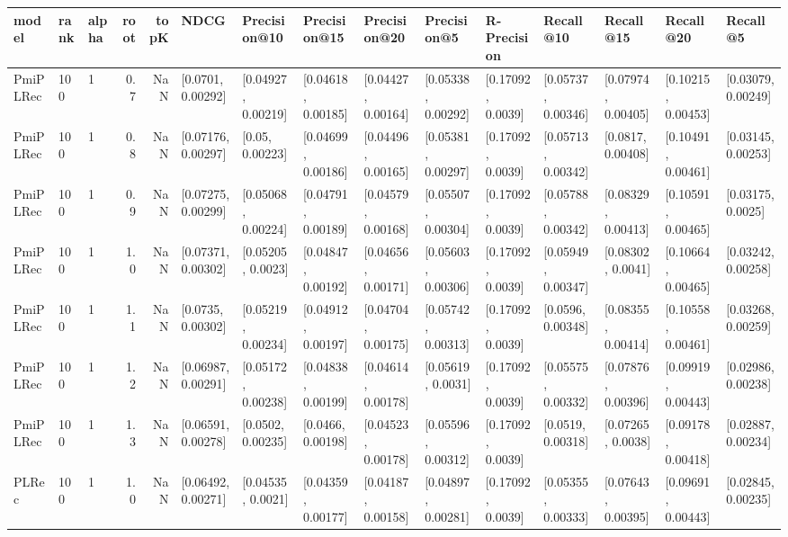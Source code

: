 \begin{tabular}{lllrrllllllllll}
\toprule
     model & rank & alpha &  root &  topK &                NDCG &        Precision@10 &        Precision@15 &        Precision@20 &         Precision@5 &        R-Precision &           Recall@10 &           Recall@15 &           Recall@20 &            Recall@5 \\
\midrule
  PmiPLRec &  100 &     1 &   0.7 &   NaN &   [0.0701, 0.00292] &  [0.04927, 0.00219] &  [0.04618, 0.00185] &  [0.04427, 0.00164] &  [0.05338, 0.00292] &  [0.17092, 0.0039] &  [0.05737, 0.00346] &  [0.07974, 0.00405] &  [0.10215, 0.00453] &  [0.03079, 0.00249] \\
  PmiPLRec &  100 &     1 &   0.8 &   NaN &  [0.07176, 0.00297] &     [0.05, 0.00223] &  [0.04699, 0.00186] &  [0.04496, 0.00165] &  [0.05381, 0.00297] &  [0.17092, 0.0039] &  [0.05713, 0.00342] &   [0.0817, 0.00408] &  [0.10491, 0.00461] &  [0.03145, 0.00253] \\
  PmiPLRec &  100 &     1 &   0.9 &   NaN &  [0.07275, 0.00299] &  [0.05068, 0.00224] &  [0.04791, 0.00189] &  [0.04579, 0.00168] &  [0.05507, 0.00304] &  [0.17092, 0.0039] &  [0.05788, 0.00342] &  [0.08329, 0.00413] &  [0.10591, 0.00465] &   [0.03175, 0.0025] \\
  PmiPLRec &  100 &     1 &   1.0 &   NaN &  [0.07371, 0.00302] &   [0.05205, 0.0023] &  [0.04847, 0.00192] &  [0.04656, 0.00171] &  [0.05603, 0.00306] &  [0.17092, 0.0039] &  [0.05949, 0.00347] &   [0.08302, 0.0041] &  [0.10664, 0.00465] &  [0.03242, 0.00258] \\
  PmiPLRec &  100 &     1 &   1.1 &   NaN &   [0.0735, 0.00302] &  [0.05219, 0.00234] &  [0.04912, 0.00197] &  [0.04704, 0.00175] &  [0.05742, 0.00313] &  [0.17092, 0.0039] &   [0.0596, 0.00348] &  [0.08355, 0.00414] &  [0.10558, 0.00461] &  [0.03268, 0.00259] \\
  PmiPLRec &  100 &     1 &   1.2 &   NaN &  [0.06987, 0.00291] &  [0.05172, 0.00238] &  [0.04838, 0.00199] &  [0.04614, 0.00178] &   [0.05619, 0.0031] &  [0.17092, 0.0039] &  [0.05575, 0.00332] &  [0.07876, 0.00396] &  [0.09919, 0.00443] &  [0.02986, 0.00238] \\
  PmiPLRec &  100 &     1 &   1.3 &   NaN &  [0.06591, 0.00278] &   [0.0502, 0.00235] &   [0.0466, 0.00198] &  [0.04523, 0.00178] &  [0.05596, 0.00312] &  [0.17092, 0.0039] &   [0.0519, 0.00318] &   [0.07265, 0.0038] &  [0.09178, 0.00418] &  [0.02887, 0.00234] \\
     PLRec &  100 &     1 &   1.0 &   NaN &  [0.06492, 0.00271] &   [0.04535, 0.0021] &  [0.04359, 0.00177] &  [0.04187, 0.00158] &  [0.04897, 0.00281] &  [0.17092, 0.0039] &  [0.05355, 0.00333] &  [0.07643, 0.00395] &  [0.09691, 0.00443] &  [0.02845, 0.00235] \\

\end{tabular}
